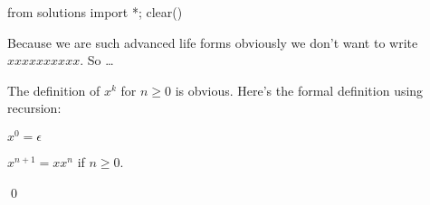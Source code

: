 \begin{python0}
from solutions import *; clear()
\end{python0}

 Because we are such advanced life forms obviously we don't want
 to write $xxxxxxxxxx$. So \ldots

 \begin{defn}  
 The definition of $x^k$ for $n \geq 0$ is obvious.
 Here's the formal definition using recursion:
 \begin{tightlist}
  \item $x^0 = \epsilon$
  \item $x^{n+1} = x x^n$ if $n \geq 0$.
 \end{tightlist}
 \qed
\end{defn}

 \newpage
 
